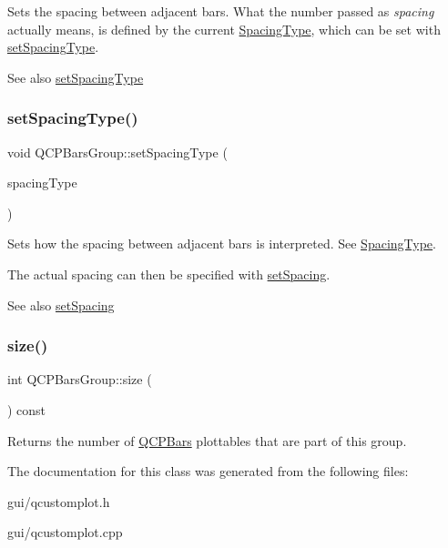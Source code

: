 Sets the spacing between adjacent bars. What the number passed as {\itshape spacing} actually means, is defined by the current \hyperlink{classQCPBarsGroup_a4c0521120a97e60bbca37677a37075b6}{Spacing\+Type}, which can be set with \hyperlink{classQCPBarsGroup_a2c7e2d61b10594a4555b615e1fcaf49e}{set\+Spacing\+Type}.

\begin{DoxySeeAlso}{See also}
\hyperlink{classQCPBarsGroup_a2c7e2d61b10594a4555b615e1fcaf49e}{set\+Spacing\+Type} 
\end{DoxySeeAlso}
\mbox{\label{classQCPBarsGroup_a2c7e2d61b10594a4555b615e1fcaf49e}} 
\subsubsection{\texorpdfstring{set\+Spacing\+Type()}{setSpacingType()}}
{\footnotesize\ttfamily void Q\+C\+P\+Bars\+Group\+::set\+Spacing\+Type (\begin{DoxyParamCaption}\item[{\hyperlink{classQCPBarsGroup_a4c0521120a97e60bbca37677a37075b6}{Spacing\+Type}}]{spacing\+Type }\end{DoxyParamCaption})}

Sets how the spacing between adjacent bars is interpreted. See \hyperlink{classQCPBarsGroup_a4c0521120a97e60bbca37677a37075b6}{Spacing\+Type}.

The actual spacing can then be specified with \hyperlink{classQCPBarsGroup_aa553d327479d72a0c3dafcc724a190e2}{set\+Spacing}.

\begin{DoxySeeAlso}{See also}
\hyperlink{classQCPBarsGroup_aa553d327479d72a0c3dafcc724a190e2}{set\+Spacing} 
\end{DoxySeeAlso}
\mbox{\label{classQCPBarsGroup_a3780ec77919cb00840207ec7a0f00dd5}} 
\subsubsection{\texorpdfstring{size()}{size()}}
{\footnotesize\ttfamily int Q\+C\+P\+Bars\+Group\+::size (\begin{DoxyParamCaption}{ }\end{DoxyParamCaption}) const\hspace{0.3cm}{\ttfamily [inline]}}

Returns the number of \hyperlink{classQCPBars}{Q\+C\+P\+Bars} plottables that are part of this group. 

The documentation for this class was generated from the following files\+:\begin{DoxyCompactItemize}
\item 
gui/qcustomplot.\+h\item 
gui/qcustomplot.\+cpp\end{DoxyCompactItemize}
